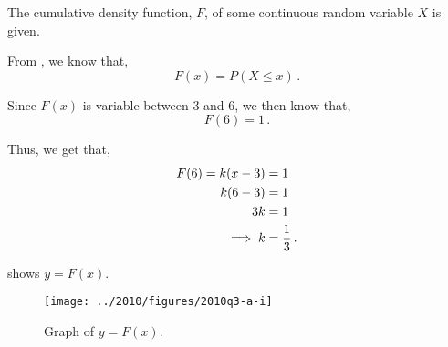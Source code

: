 %
%


\begin{subquestions}
	
\subquestion

The cumulative density function, $F$, of some continuous random variable $X$ is given.

\begin{subsubquestions}
	
\subsubquestion

From , we know that,
\begin{equation}
	F(x) = P(X \leq x) \,.
\end{equation}
	
Since $F(x)$ is variable between 3 and 6, we then know that,
\begin{equation}
	F(6) = 1 \,.
\end{equation}

Thus, we get that,
\begin{align}
	F(6) = k(x-3) & = 1 \nonumber \\
	       k(6-3) & = 1 \nonumber \\
	       3k & = 1 \nonumber \\
	       \implies k & = \frac{1}{3} \,.
\end{align}

 shows $y=F(x)$.
\begin{figure}[H]
	\begin{center}
		\texttt{[image: ../2010/figures/2010q3-a-i]}
		\caption{\label{2010:q3:fig:FGraph} Graph of $y=F(x)$.}
	\end{center}
\end{figure}


\subsubquestion


\end{subsubquestions}
\end{subquestions}
